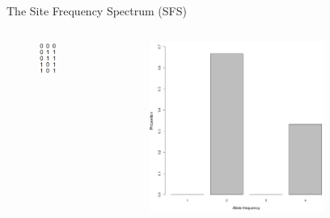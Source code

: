 \begin{frame}{The Site Frequency Spectrum (SFS)}

        \begin{columns}


                \begin{figure}
                        \includegraphics[width=0.6\textwidth]{Pics/sequences01_only}
                \end{figure}


		\begin{figure}
                        \includegraphics[width=0.75\textwidth]{Pics/SFS}
                \end{figure}

        \end{columns}

\end{frame}


